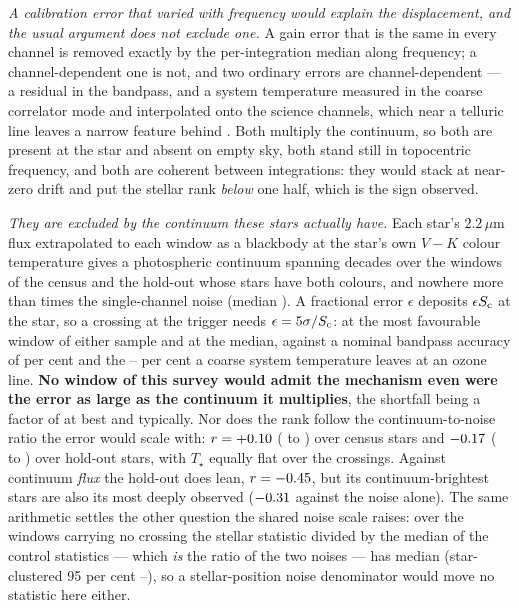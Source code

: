 \emph{A calibration error that varied with frequency would explain the
displacement, and the usual argument does not exclude one.} A gain error that
is the same in every channel is removed exactly by the per-integration median
along frequency; a channel-dependent one is not, and two ordinary errors are
channel-dependent --- a residual in the bandpass, and a system temperature
measured in the coarse correlator mode and interpolated onto the science
channels, which near a telluric line leaves a narrow feature behind
\citep{ALMATsys2018}. Both multiply the continuum, so both are present at the
star and absent on empty sky, both stand still in topocentric frequency, and
both are coherent between integrations: they would stack at near-zero drift
and put the stellar rank \emph{below} one half, which is the sign observed.

\emph{They are excluded by the continuum these stars actually have.} Each
star's $2.2\,\mu$m flux extrapolated to each window as a blackbody at the
star's own $V-K$ colour temperature gives a photospheric continuum spanning
\CdContDecades{} decades over the \CdNWin{} windows of the census and the
hold-out whose stars have both colours, and nowhere more than \CdCnrMax{}
times the single-channel noise (median \CdCnrMed). A fractional error
$\epsilon$ deposits $\epsilon S_{\rm c}$ at the star, so a crossing at the
trigger needs $\epsilon=5\sigma/S_{\rm c}$: \CdEpsMin{} at the most
favourable window of either sample and \CdEpsMed{} at the median, against a
nominal bandpass accuracy of \CdSpecBp{} per cent \citep{ALMATechNote15} and
the \CdSpecTsysLo--\CdSpecTsysHi{} per cent a coarse system temperature
leaves at an ozone line. \textbf{No window of this survey would admit the
mechanism even were the error as large as the continuum it multiplies}, the
shortfall being a factor of \CdMarginTsys{} at best and \CdMarginTsysMed{}
typically. Nor does the rank
follow the continuum-to-noise ratio the error would scale with: $r=+0.10$
(\CdRCenLo{} to \CdRCenHi) over \CdNStarCen{} census stars and $-0.17$
(\CdRHoLo{} to \CdRHoHi) over \CdNStarHo{} hold-out stars, with $T_\star$
equally flat over the \CdNTstar{} crossings. Against continuum \emph{flux}
the hold-out does lean, $r=-0.45$, but its continuum-brightest stars are
also its most deeply observed ($-0.31$ against the noise alone). The
same arithmetic settles the other question the shared noise scale raises:
over the \NsrNWin{} windows carrying no crossing the stellar statistic
divided by the median of the \NCtrl{} control statistics --- which \emph{is}
the ratio of the two noises --- has median \NsrMed{} (star-clustered 95 per
cent \NsrLo--\NsrHi), so a stellar-position noise denominator would move no
statistic here either.

